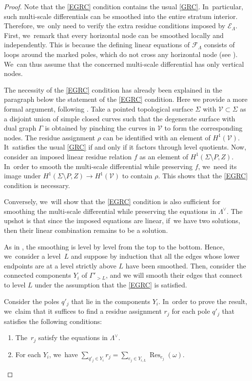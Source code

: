 \documentclass[JEP,XML,SOM,Unicode,NoFloatCountersInSection,published]{cedram}
\newenvironment{enumeratea}
{\bgroup\def\theenumi{\alph{enumi}}\begin{enumerate}}
{\end{enumerate}\egroup}
\DeclareMathOperator\Res{Res}
\theoremstyle{definition}
\begin{document}
\begin{proof}
Note that the \ref{EGRC} condition contains the usual \ref{GRC}. In~particular, such multi-scale differentials can be smoothed into the entire stratum interior. Therefore, we~only need to verify the extra residue conditions imposed by $\mathcal{E}_{\Lambda}$. First, we~remark that every horizontal node can be smoothed locally and independently. This is because the defining linear equations of $\mathcal F_{\Lambda}$ consists of loops around the marked poles, which do not cross any horizontal node (see \cite{BDG}). We~can thus assume that the concerned multi-scale differential has only vertical nodes.

The necessity of the \ref{EGRC} condition has already been explained in the paragraph below the statement of the \ref{EGRC} condition. Here we provide a more formal argument,
following \cite[Prop.\,6.3]{BCGGM3}. Take a pointed topological surface $\Sigma$ with $\mathcal{V}\subset \Sigma$ as a disjoint union of simple closed curves such that the degenerate surface with dual graph $\Gamma$ is obtained by
pinching the curves in $\mathcal{V}$ to form the corresponding nodes. The residue assignment $\rho$ can be identified with an element of $H^1(\mathcal{V})$. It~satisfies the usual \ref{GRC} if and only if it factors through level quotients. Now, consider an imposed linear residue relation $f$ as an element of $H^1(\Sigma \setminus P, Z)$. In~order to smooth the multi-scale differential while preserving $f$, we~need its image under $H^1(\Sigma \setminus P, Z) \to H^1(\mathcal{V})$ to contain $\rho$. This shows that the \ref{EGRC} condition is necessary.

Conversely, we~will show that the \ref{EGRC} condition is also sufficient for smoothing the multi-scale differential while preserving the equations in $\Lambda^{\vee}$. The upshot is that since the imposed equations are linear, if~we have two solutions, then their linear combination remains to be a solution.

As in \cite{BCGGM}, the smoothing is level by level from the top to the bottom. Hence, we~consider a level~$L$ and suppose by induction that all the edges whose lower endpoints are at a level strictly above $L$ have been smoothed. Then, consider the connected components $Y_i$ of $\Gamma'_{>L}$, and we will smooth their edges that connect to level $L$ under the assumption that the \ref{EGRC} is satisfied.

Consider the poles $q'_{j}$ that lie in the components $Y_{i}$. In~order to prove the result, we~claim that it suffices to find a residue assignment $r_{j}$ for each pole $q'_{j}$ that satisfies the following conditions:
\begin{enumeratea}
\item\label{enum:a}
The~$r_{j}$ satisfy the equations in $\Lambda^{\vee}$.
\item\label{enum:b}
For each $Y_{i}$, we~have $\sum_{q'_j\in Y_i}r_{j}=\sum_{e_j \in Y_{i, L}} \Res_{e_j} (\omega)$.
\end{enumeratea}


\end{proof}
\end{document}
